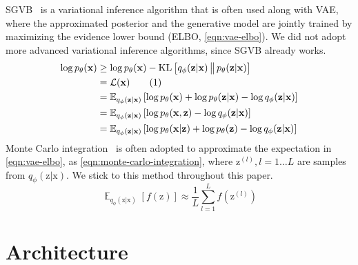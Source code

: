 \documentclass[sigconf]{acmart}
\newcommand{\numberthis}{\stepcounter{equation}\tag{\theequation}}
\newcommand{\vv}[1]{\bm{\mathrm{{#1}}}}
\newcommand{\EEE}[2]{\operatorname{\mathbb{E}}_{{#1}}\left[{#2}\right]}
\newcommand{\KLDD}[2]{\operatorname{KL}\left[{#1}\,\big\|\,{#2}\right]}
\begin{document}
SGVB~\cite{kingma_auto-encoding_2014,rezende_stochastic_2014} is a variational inference algorithm that is often used along with VAE, where the approximated posterior and the generative model are jointly trained by maximizing the evidence lower bound (ELBO, \cref{eqn:vae-elbo}).
We did not adopt more advanced variational inference algorithms, since SGVB already works.
\begin{align*}
	\log p_{\theta}(\vv{\vv{x}}) &\geq \log p_{\theta}(\vv{x}) - \KLDD{q_{\phi}(\vv{z}|\vv{x})}{p_{\theta}(\vv{z}|\vv{x})} \\
		&= \mathcal{L}(\vv{x}) \numberthis\label{eqn:vae-elbo} \\
		&= \EEE{q_{\phi}(\vv{z}|\vv{x})}{\log p_{\theta}(\vv{x}) + \log p_{\theta}(\vv{z}|\vv{x}) - \log q_{\phi}(\vv{z}|\vv{x})} \\
		&= \EEE{q_{\phi}(\vv{z}|\vv{x})}{\log p_{\theta}(\vv{x},\vv{z}) - \log q_{\phi}(\vv{z}|\vv{x})} \\
		&= \EEE{q_{\phi}(\vv{z}|\vv{x})}{\log p_{\theta}(\vv{x}|\vv{z}) + \log p_{\theta}(\vv{z}) - \log q_{\phi}(\vv{z}|\vv{x})}
\end{align*}
Monte Carlo integration~\cite{geweke1989bayesian} is often adopted to approximate the expectation in \cref{eqn:vae-elbo}, as \cref{eqn:monte-carlo-integration}, where $\vv{z}^{(l)}, l=1 \dots L$ are samples from $q_{\phi}(\vv{z}|\vv{x})$.
We stick to this method throughout this paper.
\begin{equation}
	\EEE{q_{\phi}(\vv{z}|\vv{x})}{f(\vv{z})}
		\approx \frac{1}{L} \sum_{l=1}^L f(\vv{z}^{(l)})
	\label{eqn:monte-carlo-integration}
\end{equation}





\section{Architecture}
\label{sec:architecture}
\end{document}
